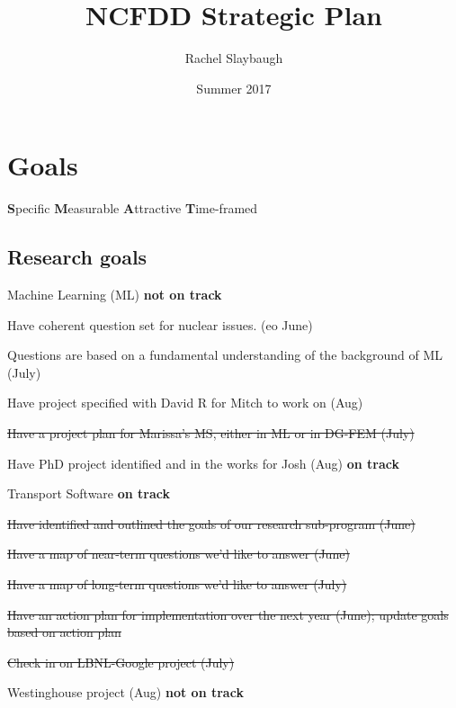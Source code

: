 \documentclass[12pt,twoside]{article}
\date{Summer 2017}
\title{NCFDD Strategic Plan}
\author{Rachel Slaybaugh}
\begin{document}
\maketitle

\section{Goals}
\textbf{S}pecific \textbf{M}easurable \textbf{A}ttractive \textbf{T}ime-framed

\subsection{Research goals}
\begin{compactitem}
\item Machine Learning (ML) \textbf{not on track}
  \begin{compactitem}
  \item Have coherent question set for nuclear issues. (eo June)
  \item Questions are based on a fundamental understanding of the background of ML (July)
  \item Have project specified with David R for Mitch to work on (Aug)
  \end{compactitem}
\item \st{Have a project plan for Marissa's MS, either in ML or in DG-FEM (July)}
\item Have PhD project identified and in the works for Josh (Aug) \textbf{on track}
\item Transport Software \textbf{on track}
  \begin{compactitem}
  \item \st{Have identified and outlined the goals of our research sub-program (June)}
  \item \st{Have a map of near-term questions we'd like to answer (June)} 
  \item \st{Have a map of long-term questions we'd like to answer (July)}
  \item \st{Have an action plan for implementation over the next year (June); update goals based on action plan}
  \end{compactitem}
\item \st{Check in on LBNL-Google project (July)}
\item Westinghouse project (Aug) \textbf{not on track}
\end{compactitem}
\end{document}
